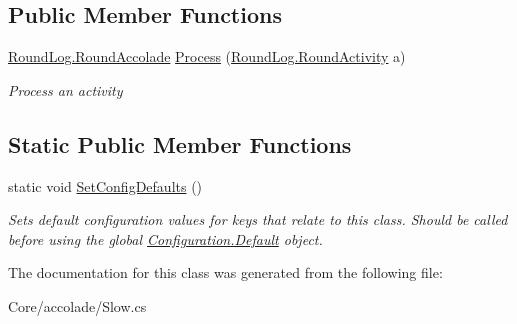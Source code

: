 \subsection*{Public Member Functions}
\begin{DoxyCompactItemize}
\item 
\hypertarget{class_m_b_c_1_1_core_1_1mbc_1_1accolade_1_1_slow_a5849f255e32663d6f88d804bffc7b1fb}{\hyperlink{class_m_b_c_1_1_core_1_1_round_log_a4060830ca7135aa755ec5b6d24aa30e6}{Round\-Log.\-Round\-Accolade} \hyperlink{class_m_b_c_1_1_core_1_1mbc_1_1accolade_1_1_slow_a5849f255e32663d6f88d804bffc7b1fb}{Process} (\hyperlink{class_m_b_c_1_1_core_1_1_round_log_1_1_round_activity}{Round\-Log.\-Round\-Activity} a)}\label{class_m_b_c_1_1_core_1_1mbc_1_1accolade_1_1_slow_a5849f255e32663d6f88d804bffc7b1fb}

\begin{DoxyCompactList}\small\item\em Process an activity\end{DoxyCompactList}\end{DoxyCompactItemize}
\subsection*{Static Public Member Functions}
\begin{DoxyCompactItemize}
\item 
\hypertarget{class_m_b_c_1_1_core_1_1mbc_1_1accolade_1_1_slow_af38c3937a70eeb0c92512340a974fe65}{static void \hyperlink{class_m_b_c_1_1_core_1_1mbc_1_1accolade_1_1_slow_af38c3937a70eeb0c92512340a974fe65}{Set\-Config\-Defaults} ()}\label{class_m_b_c_1_1_core_1_1mbc_1_1accolade_1_1_slow_af38c3937a70eeb0c92512340a974fe65}

\begin{DoxyCompactList}\small\item\em Sets default configuration values for keys that relate to this class. Should be called before using the global \hyperlink{class_m_b_c_1_1_core_1_1_configuration_a5db184730b6c51c2ae617d0fc1976c13}{Configuration.\-Default} object.\end{DoxyCompactList}\end{DoxyCompactItemize}


The documentation for this class was generated from the following file\-:\begin{DoxyCompactItemize}
\item 
Core/accolade/Slow.\-cs\end{DoxyCompactItemize}
